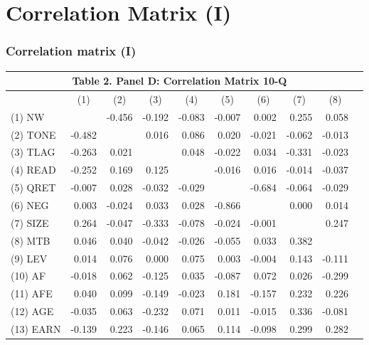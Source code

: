 \documentclass{beamer}
\begin{document}
\section{Correlation Matrix (I)}
\begin{frame}[noframenumbering]
	\frametitle{Correlation matrix (I)}
	\begin{table}[H] \label{T2PD}
		\centering \scriptsize
		\begin{tabular}{lrrrrrrrrr}
			\multicolumn{9}{c}{\textbf{Table 2. Panel D: Correlation Matrix 10-Q}} \\
			\midrule
			\midrule
			& \multicolumn{1}{c}{(1)} & \multicolumn{1}{c}{(2)} & \multicolumn{1}{c}{(3)} & \multicolumn{1}{c}{(4)} & \multicolumn{1}{c}{(5)} & \multicolumn{1}{c}{(6)} & \multicolumn{1}{c}{(7)} & \multicolumn{1}{c}{(8)} \\
			\midrule
			(1) NW &  & -0.456 & -0.192 & -0.083 & -0.007 & 0.002 & 0.255 & 0.058 & \\
			(2) TONE & -0.482 &  & 0.016 & 0.086 & 0.020 & -0.021 & -0.062 & -0.013 &  \\
			(3) TLAG & -0.263 & 0.021 &  & 0.048 & -0.022 & 0.034 & -0.331 & -0.023 & \\
			(4) READ & -0.252 & 0.169 & 0.125 &  & -0.016 & 0.016 & -0.014 & -0.037 & \\
			(5) QRET & -0.007 & 0.028 & -0.032 & -0.029 &  & -0.684 & -0.064 & -0.029 & \\
			(6) NEG & 0.003 & -0.024 & 0.033 & 0.028 & -0.866 &  & 0.000 & 0.014 &  \\
			(7) SIZE & 0.264 & -0.047 & -0.333 & -0.078 & -0.024 & -0.001 &  & 0.247 & \\
			(8) MTB & 0.046 & 0.040 & -0.042 & -0.026 & -0.055 & 0.033 & 0.382 &  &  \\
			(9) LEV & 0.014 & 0.076 & 0.000 & 0.075 & 0.003 & -0.004 & 0.143 & -0.111 &  \\
			(10) AF & -0.018 & 0.062 & -0.125 & 0.035 & -0.087 & 0.072 & 0.026 & -0.299 &  \\
			(11) AFE & 0.040 & 0.099 & -0.149 & -0.023 & 0.181 & -0.157 & 0.232 & 0.226 &  \\
			(12) AGE & -0.035 & 0.063 & -0.232 & 0.071 & 0.011 & -0.015 & 0.336 & -0.081 &  \\
			(13) EARN & -0.139 & 0.223 & -0.146 & 0.065 & 0.114 & -0.098 & 0.299 & 0.282 &  \\

\end{tabular}
\end{table}
\end{frame}
\end{document}

